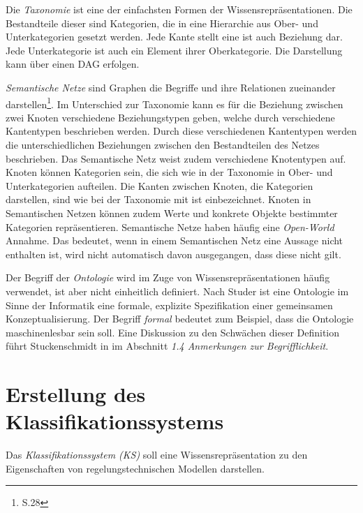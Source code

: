 Die \textit{Taxonomie} ist eine der einfachsten Formen der Wissensrepräsentationen. Die Bestandteile dieser sind Kategorien, die in eine Hierarchie aus Ober- und Unterkategorien gesetzt werden. Jede Kante stellt eine \glqq ist auch \grqq Beziehung dar. Jede Unterkategorie ist auch ein Element ihrer Oberkategorie. Die Darstellung kann über einen DAG erfolgen.

\textit{Semantische Netze} \glqq sind Graphen die Begriffe und ihre Relationen zueinander darstellen\grqq\footnote{\cite{STU09} S.28}. Im Unterschied zur Taxonomie kann es für die Beziehung zwischen zwei Knoten verschiedene Beziehungstypen geben, welche durch verschiedene Kantentypen beschrieben werden. Durch diese verschiedenen Kantentypen werden die unterschiedlichen Beziehungen zwischen den Bestandteilen des Netzes beschrieben. Das Semantische Netz weist zudem verschiedene Knotentypen auf. Knoten können Kategorien sein, die sich wie in der Taxonomie in Ober- und Unterkategorien aufteilen. Die Kanten zwischen Knoten, die Kategorien darstellen, sind wie bei der Taxonomie mit \glqq ist ein\grqq bezeichnet. Knoten in Semantischen Netzen können zudem Werte und konkrete Objekte bestimmter Kategorien repräsentieren.
Semantische Netze haben häufig eine \textit{Open-World} Annahme. Das bedeutet, wenn in einem Semantischen Netz eine Aussage nicht enthalten ist, wird nicht automatisch davon ausgegangen, dass diese nicht gilt.

Der Begriff der \textit{Ontologie} wird im Zuge von Wissensrepräsentationen häufig verwendet, ist aber nicht einheitlich definiert. Nach Studer \cite{STBEFE98} ist eine Ontologie im Sinne der Informatik eine \glqq formale, explizite Spezifikation einer gemeinsamen Konzeptualisierung\grqq. Der Begriff \textit{formal} bedeutet zum Beispiel, dass die Ontologie maschinenlesbar sein soll. Eine Diskussion zu den Schwächen dieser Definition führt Stuckenschmidt in \cite{STU09} im Abschnitt \textit{1.4 Anmerkungen zur Begrifflichkeit}. 

\section{Erstellung des Klassifikationssystems}
\label{Ch:Vorbetrachtung:Sec:KS}
Das \textit{Klassifikationssystem (KS)} soll eine Wissensrepräsentation zu den Eigenschaften von regelungstechnischen Modellen darstellen. 

